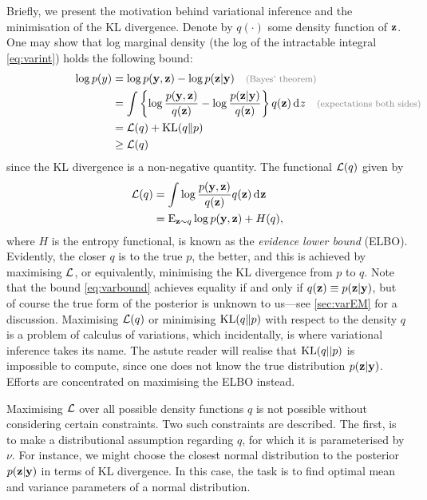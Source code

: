 Briefly, we present the motivation behind variational inference and the minimisation of the KL divergence.
Denote by $q(\cdot)$ some density function of ${\mathbf z}$.
One may show that log marginal density (the log of the intractable integral \cref{eq:varint}) holds the following bound:
\begin{align}
  \log p(y) &= \log p(\by,\bz) - \log p(\bz|\by) \mycomment{\footnotesize (Bayes' theorem)} \nonumber \\
  &= \int \left\{ \log \frac{p(\by,\bz)}{q(\bz)} - \log \frac{p(\bz|\by)}{q(\bz)} \right\} q(\bz) \dint z \mycomment{\footnotesize (expectations both sides)} \hspace{0.7cm} \nonumber \\    
  &=  \cL(q) +  \KL(q \Vert p) \nonumber \\
  &\geq \cL(q) \label{eq:varbound}
\end{align}
since the KL divergence is a non-negative quantity.
The functional ${\mathcal L}(q)$ given by 
\begin{align}
  {\mathcal L}(q) 
  &= \int \log \frac{p({\mathbf y},{\mathbf z})}{q({\mathbf z})} q({\mathbf z}) \operatorname{d}\hspace{0.5pt}\! {\mathbf z} \nonumber \\
  &= \operatorname{E}_{{\mathbf z}\sim q}\log p({\mathbf y},{\mathbf z}) + H(q), \label{eq:elbo1}
\end{align}
where $H$ is the entropy functional, is known as the \emph{evidence lower bound} (ELBO).
Evidently, the closer $q$ is to the true $p$, the better, and this is achieved by maximising ${\mathcal L}$, or equivalently, minimising the KL divergence from $p$ to $q$.
Note that the bound \cref{eq:varbound} achieves equality if and only if $q({\mathbf z}) \equiv p({\mathbf z}|{\mathbf y})$, but of course the true form of the posterior is unknown to us---see \cref{sec:varEM} for a discussion.
Maximising ${\mathcal L}(q)$ or minimising $\operatorname{KL}(q\Vert p)$ with respect to the density $q$ is a problem of calculus of variations, which incidentally, is where variational inference takes its name.
The astute reader will realise that $\operatorname{KL}(q||p)$ is impossible to compute, since one does not know the true distribution $p({\mathbf z}|{\mathbf y})$. Efforts are concentrated on maximising the ELBO instead.

Maximising ${\mathcal L}$ over all possible density functions $q$ is not possible without considering certain constraints.
Two such constraints are described. 
The first, is to make a distributional assumption regarding $q$, for which it is parameterised by $\nu$.
For instance, we might choose the closest normal distribution to the posterior $p({\mathbf z}|{\mathbf y})$ in terms of KL divergence.
In this case, the task is to find optimal mean and variance parameters of a normal distribution.


